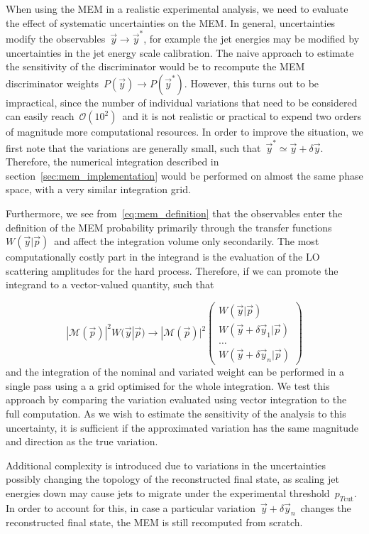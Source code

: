 When using the MEM in a realistic experimental analysis, we need to evaluate the effect of systematic uncertainties on the MEM. In general, uncertainties modify the observables~$\vec{y} \rightarrow \vec{y}^*$, for example the jet energies may be modified by uncertainties in the jet energy scale calibration. The naive approach to estimate the sensitivity of the discriminator would be to recompute the MEM discriminator weights~$P(\vec{y}) \rightarrow P(\vec{y}^*)$. However, this turns out to be impractical, since the number of individual variations that need to be considered can easily reach~$\mathcal{O}(10^2)$~and it is not realistic or practical to expend two orders of magnitude more computational resources.
In order to improve the situation, we first note that the variations are generally small, such that~$\vec{y}^* \simeq \vec{y} + \delta \vec{y}$. Therefore, the numerical integration described in section~\cref{sec:mem_implementation} would be performed on almost the same phase space, with a very similar integration grid.

Furthermore, we see from~\cref{eq:mem_definition} that the observables enter the definition of the MEM probability primarily through the transfer functions~$W(\vec{y} | \vec{p})$~and affect the integration volume only secondarily. The most computationally costly part in the integrand is the evaluation of the LO scattering amplitudes for the hard process. Therefore, if we can promote the integrand to a vector-valued quantity, such that

\begin{equation}
|\mathcal{M}(\vec{p})|^2 W(\vec{y} | \vec{p}) \rightarrow |\mathcal{M}(\vec{p})|^2  \begin{pmatrix}
  W(\vec{y} | \vec{p}) \\
  W(\vec{y} + \delta \vec{y}_1 | \vec{p}) \\
  \dots \\
  W(\vec{y} + \delta \vec{y}_n | \vec{p})
 \end{pmatrix}
\end{equation}
and the integration of the nominal and variated weight can be performed in a single pass using a a grid optimised for the whole integration. We test this approach by comparing the variation evaluated using vector integration to the full computation. As we wish to estimate the sensitivity of the analysis to this uncertainty, it is sufficient if the approximated variation has the same magnitude and direction as the true variation.

Additional complexity is introduced due to variations in the uncertainties possibly changing the topology of the reconstructed final state, as scaling jet energies down may cause jets to migrate under the experimental threshold~$p_{T\mathrm{cut}}$. In order to account for this, in case a particular variation~$\vec{y} + \delta \vec{y}_n$~changes the reconstructed final state, the MEM is still recomputed from scratch.

